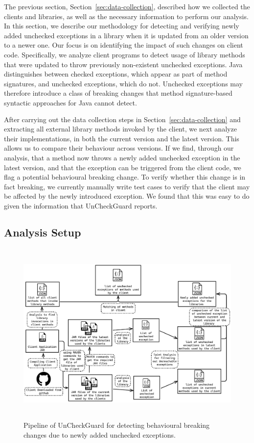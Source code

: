 The previous section, Section~\ref{sec:data-collection}, described how we collected the clients and libraries, as well as the necessary information to perform our analysis.
In this section, we describe our methodology for detecting and verifying newly added unchecked exceptions in a library when it is updated from an older version to a newer one. Our focus is on identifying the impact of such changes on client code. Specifically, we analyze client programs to detect usage of library methods that were updated to throw previously non-existent unchecked exceptions. Java distinguishes between checked exceptions, which appear as part of method signatures, and unchecked exceptions, which do not. Unchecked exceptions may therefore introduce a class of breaking changes that method signature-based syntactic approaches for Java cannot detect.

After carrying out the data collection steps in Section~\ref{sec:data-collection} and extracting all external library methods invoked by the client, we next analyze their implementations, in both the current version and the latest version. This allows us to compare their behaviour across versions. If we find, through our analysis, that a method now throws a newly added unchecked exception in the latest version, and that the exception can be triggered from the client code, we flag a potential behavioural breaking change. To verify whether this change is in fact breaking, we currently manually write test cases to verify that the client may be affected by the newly introduced exception. We found that this was easy to do given the information that UnCheckGuard reports.

\subsection{Analysis Setup}

\begin{figure}[hbt!]
    \centering
    \includegraphics[height=260pt]{diagram/updatepipeline.png}
    \caption{Pipeline of UnCheckGuard for detecting behavioural breaking changes due to newly added unchecked exceptions.}
    \label{fig:jsonjava}
\end{figure}

